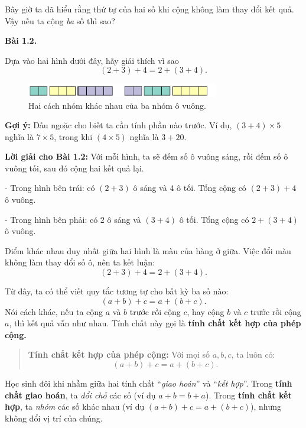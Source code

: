 \documentclass[14pt,a4paper]{extbook}
\newenvironment{problem}[1][]{
  \par\noindent\textbf{Bài #1.}\ \ignorespaces
}{\par}
\begin{document}
Bây giờ ta đã hiểu rằng thứ tự của hai số khi cộng không làm thay đổi kết quả.
Vậy nếu ta cộng \emph{ba} số thì sao?

\begin{problem}[1.2]
Dựa vào hai hình dưới đây, hãy giải thích vì sao
\[
(2 + 3) + 4 = 2 + (3 + 4).
\]

\begin{figure}[ht!]
  \centering
  \includegraphics[width=0.75\textwidth]{img/fig-prob1.2-assoc.pdf}
  \caption*{\small Hai cách nhóm khác nhau của ba nhóm ô vuông.}
\end{figure}
\end{problem}

\noindent\textbf{Gợi ý:} Dấu ngoặc cho biết ta cần tính phần nào trước.
Ví dụ, $(3 + 4) \times 5$ nghĩa là $7 \times 5$, trong khi $(4 \times 5)$ nghĩa là $3 + 20$.


\textbf{Lời giải cho Bài 1.2:}  
Với mỗi hình, ta sẽ đếm số ô vuông sáng, rồi đếm số ô vuông tối, sau đó cộng hai kết quả lại.

- Trong hình bên trái: có $(2 + 3)$ ô sáng và $4$ ô tối.  
  Tổng cộng có $(2 + 3) + 4$ ô vuông.

- Trong hình bên phải: có $2$ ô sáng và $(3 + 4)$ ô tối.  
  Tổng cộng có $2 + (3 + 4)$ ô vuông.

Điểm khác nhau duy nhất giữa hai hình là màu của hàng ở giữa.  
Việc đổi màu không làm thay đổi số ô, nên ta kết luận:
\[
(2 + 3) + 4 = 2 + (3 + 4).
\]

Từ đây, ta có thể viết quy tắc tương tự cho bất kỳ ba số nào:
\[
(a + b) + c = a + (b + c).
\]
Nói cách khác, nếu ta cộng $a$ và $b$ trước rồi cộng $c$,  
hay cộng $b$ và $c$ trước rồi cộng $a$, thì kết quả vẫn như nhau.  
Tính chất này gọi là \textbf{tính chất kết hợp của phép cộng.}

\begin{quote}
\textbf{Tính chất kết hợp của phép cộng:}  
Với mọi số $a, b, c$, ta luôn có:
\[
(a + b) + c = a + (b + c).
\]
\end{quote}

\begin{tcolorbox}[colback=yellow!10!white,colframe=orange!80!black,title={Lưu ý quan trọng}]
Học sinh đôi khi nhầm giữa hai tính chất “\emph{giao hoán}” và “\emph{kết hợp}”.  
Trong \textbf{tính chất giao hoán}, ta \emph{đổi chỗ} các số (ví dụ $a+b=b+a$).  
Trong \textbf{tính chất kết hợp}, ta \emph{nhóm} các số khác nhau  
(ví dụ $(a+b)+c=a+(b+c)$), nhưng không đổi vị trí của chúng.
\end{tcolorbox}
\end{document}
